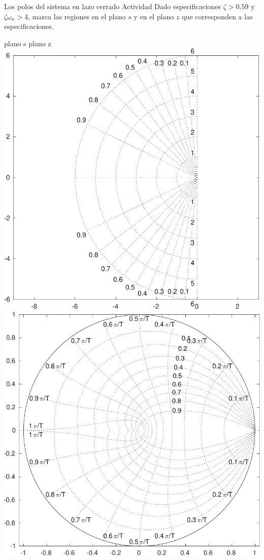 \documentclass[presentation,aspectratio=169]{beamer}
\begin{document}
\begin{frame}[label={sec:orgdcc34dc}]{Los polos del sistema en lazo cerrado}
\alert{Actividad} Dado especificaciones \(\zeta > 0.59\) y \(\zeta\omega_n > 4\), marca las regiones en el plano \(s\) y en el plano \(z\) que corresponden a las especificaciones.
\begin{center}
\alert{plano s} \hspace*{0.4\linewidth} \alert{plano z}\\
\includegraphics[height=0.61\textheight]{../../figures/sgrid-crop} \hspace*{3mm}
\includegraphics[height=0.6\textheight]{../../figures/zgrid-crop}\\
\end{center}
\end{frame}
\end{document}
